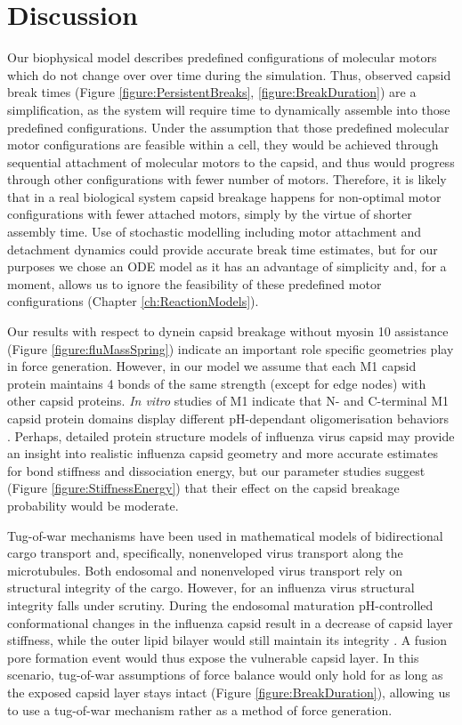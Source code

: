 \section{Discussion}

Our biophysical model describes predefined configurations of molecular motors which do not change over over time during the simulation. Thus, observed capsid break times (Figure \ref{figure:PersistentBreaks}, \ref{figure:BreakDuration}) are a simplification, as the system will require time to dynamically assemble into those predefined configurations. Under the assumption that those predefined molecular motor configurations are feasible within a cell, they would be achieved through sequential attachment of molecular motors to the capsid, and thus would progress through other configurations with fewer number of motors. Therefore, it is likely that in a real biological system capsid breakage happens for non-optimal motor configurations with fewer attached motors, simply by the virtue of shorter assembly time. Use of stochastic modelling including motor attachment and detachment dynamics could provide accurate break time estimates, but for our purposes we chose an ODE model as it has an advantage of simplicity and, for a moment, allows us to ignore the feasibility of these predefined motor configurations (Chapter \ref{ch:ReactionModels}).

Our results with respect to dynein capsid breakage without myosin 10 assistance (Figure \ref{figure:fluMassSpring}) indicate an important role specific geometries play in force generation. However, in our model we assume that each M1 capsid protein maintains 4 bonds of the same strength (except for edge nodes) with other capsid proteins. \textit{In vitro} studies of M1 indicate that N- and C-terminal M1 capsid protein domains display different pH-dependant oligomerisation behaviors \cite{zhang2012dissection}. Perhaps, detailed protein structure models of influenza virus capsid may provide an insight into realistic influenza capsid geometry and more accurate estimates for bond stiffness and dissociation energy, but our parameter studies suggest (Figure \ref{figure:StiffnessEnergy}) that their effect on the capsid breakage probability would be moderate.

Tug-of-war mechanisms \cite{hancock2014bidirectional} have been used in mathematical models of bidirectional cargo transport \cite{muller2008tug} and, specifically, nonenveloped virus transport \cite{gazzola2009stochastic} along the microtubules. Both endosomal and nonenveloped virus transport rely on structural integrity of the cargo. However, for an influenza virus structural integrity falls under scrutiny. During the endosomal maturation pH-controlled conformational changes in the influenza capsid result in a decrease of capsid layer stiffness, while the outer lipid bilayer would still maintain its integrity \cite{li2014ph}. A fusion pore formation event would thus expose the vulnerable capsid layer. In this scenario, tug-of-war assumptions of force balance would only hold for as long as the exposed capsid layer stays intact (Figure \ref{figure:BreakDuration}), allowing us to use a tug-of-war mechanism rather as a method of force generation.

